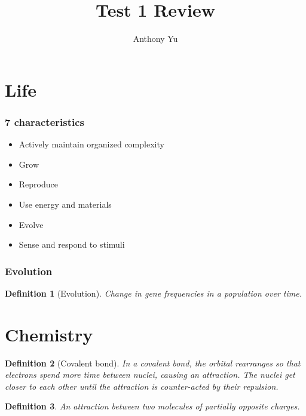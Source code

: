 \documentclass[12pt]{article}
\title{Test 1 Review}
\author{Anthony Yu}
\begin{document}
\newcommand{\problem}[1]{\subsection*{Problem {#1}}}
\newenvironment{enumAlph}{\begin{enumerate}[label=(\alph*)]}{\end{enumerate}}

\makeatletter
\newcommand{\skipitems}[1]{%
\addtocounter{\@enumctr}{#1}%
}
\makeatother

\newcommand{\chunit}[3]{\qty{#1}{{#2}\,\ce{#3}}}
\newcommand{\chuniteval}[3]{\qty[evaluate-expression]{#1}{{#2}\,\ce{#3}}}

\newtheorem{definition}{Definition}

\maketitle

\part{Life}
\section{7 characteristics}
\begin{itemize}
    \item Actively maintain organized complexity
    \item Grow
    \item Reproduce
    \item Use energy and materials
    \item Evolve
    \item Sense and respond to stimuli
\end{itemize}

\section{Evolution}

\begin{definition}[Evolution]
    Change in gene frequencies in a population over time. 
\end{definition}

\part{Chemistry}
\begin{definition}[Covalent bond]
    In a covalent bond, the orbital rearranges so that electrons spend more time 
    between nuclei, causing an attraction. The nuclei get closer to each other
    until the attraction is counter-acted by their repulsion. 
\end{definition}
\begin{definition}
    An attraction between two molecules of partially opposite charges.
\end{definition}
\end{document}
